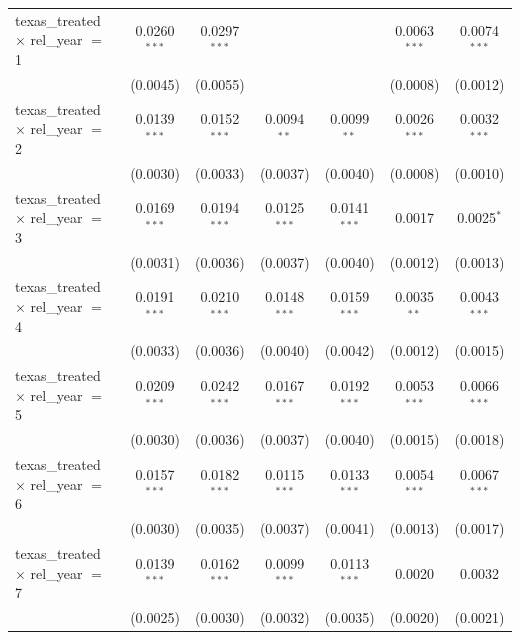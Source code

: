 \begin{tabular}{lcccccc}
   texas\_treated $\times$ rel\_year $=$ 1      & 0.0260$^{***}$ & 0.0297$^{***}$ &                &                & 0.0063$^{***}$  & 0.0074$^{***}$\\   
                                                & (0.0045)       & (0.0055)       &                &                & (0.0008)        & (0.0012)\\   
   texas\_treated $\times$ rel\_year $=$ 2      & 0.0139$^{***}$ & 0.0152$^{***}$ & 0.0094$^{**}$  & 0.0099$^{**}$  & 0.0026$^{***}$  & 0.0032$^{***}$\\   
                                                & (0.0030)       & (0.0033)       & (0.0037)       & (0.0040)       & (0.0008)        & (0.0010)\\   
   texas\_treated $\times$ rel\_year $=$ 3      & 0.0169$^{***}$ & 0.0194$^{***}$ & 0.0125$^{***}$ & 0.0141$^{***}$ & 0.0017          & 0.0025$^{*}$\\   
                                                & (0.0031)       & (0.0036)       & (0.0037)       & (0.0040)       & (0.0012)        & (0.0013)\\   
   texas\_treated $\times$ rel\_year $=$ 4      & 0.0191$^{***}$ & 0.0210$^{***}$ & 0.0148$^{***}$ & 0.0159$^{***}$ & 0.0035$^{**}$   & 0.0043$^{***}$\\   
                                                & (0.0033)       & (0.0036)       & (0.0040)       & (0.0042)       & (0.0012)        & (0.0015)\\   
   texas\_treated $\times$ rel\_year $=$ 5      & 0.0209$^{***}$ & 0.0242$^{***}$ & 0.0167$^{***}$ & 0.0192$^{***}$ & 0.0053$^{***}$  & 0.0066$^{***}$\\   
                                                & (0.0030)       & (0.0036)       & (0.0037)       & (0.0040)       & (0.0015)        & (0.0018)\\   
   texas\_treated $\times$ rel\_year $=$ 6      & 0.0157$^{***}$ & 0.0182$^{***}$ & 0.0115$^{***}$ & 0.0133$^{***}$ & 0.0054$^{***}$  & 0.0067$^{***}$\\   
                                                & (0.0030)       & (0.0035)       & (0.0037)       & (0.0041)       & (0.0013)        & (0.0017)\\   
   texas\_treated $\times$ rel\_year $=$ 7      & 0.0139$^{***}$ & 0.0162$^{***}$ & 0.0099$^{***}$ & 0.0113$^{***}$ & 0.0020          & 0.0032\\   
                                                & (0.0025)       & (0.0030)       & (0.0032)       & (0.0035)       & (0.0020)        & (0.0021)\\   

\end{tabular}
